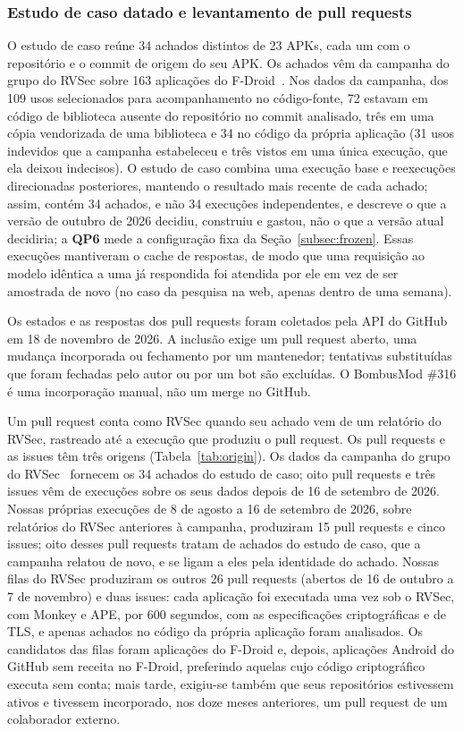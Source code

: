 \documentclass[conference]{IEEEtran}
\newcommand{\researchq}[1]{\textbf{QP#1}}
\begin{document}
\subsubsection{Estudo de caso datado e levantamento de pull requests}

O estudo de caso reúne 34 achados distintos de 23 APKs, cada um com o
repositório e o commit de origem do seu APK. Os achados vêm da campanha do grupo do
RVSec sobre 163 aplicações do F-Droid~\cite{costa2026effectiveness}. Nos dados da campanha, dos 109 usos
selecionados para acompanhamento no código-fonte, 72 estavam em
código de biblioteca ausente do repositório no commit analisado, três em uma cópia
vendorizada de uma biblioteca e 34 no código da própria aplicação (31 usos
indevidos que a campanha estabeleceu e três vistos em uma única execução, que
ela deixou indecisos). O estudo de caso combina uma execução base e reexecuções
direcionadas posteriores, mantendo o resultado mais recente de cada achado; assim, contém 34
achados, e não 34 execuções independentes, e descreve o que a
versão de outubro de 2026 decidiu, construiu e gastou, não o que a versão atual
decidiria; a \researchq{6} mede a configuração fixa da
Seção~\ref{subsec:frozen}. Essas execuções mantiveram o cache de respostas, de
modo que uma requisição ao modelo idêntica a uma já respondida foi atendida por
ele em vez de ser amostrada de novo (no caso da pesquisa na web, apenas dentro
de uma semana).

Os estados e as respostas dos pull requests foram coletados pela API do GitHub em
18 de novembro de 2026. A inclusão exige um pull request aberto, uma mudança incorporada ou fechamento
por um mantenedor; tentativas substituídas que foram fechadas pelo autor ou por um bot são
excluídas. O BombusMod \#316 é uma incorporação manual, não um merge no GitHub.

Um pull request conta como RVSec quando seu achado vem de um relatório do RVSec,
rastreado até a execução que produziu o pull request. Os pull requests e as
issues têm três origens (Tabela~\ref{tab:origin}). Os dados da campanha do grupo do
RVSec~\cite{costa2026effectiveness} fornecem os 34 achados do estudo de caso;
oito pull requests e três issues vêm de execuções sobre os seus dados depois de
16 de setembro de 2026. Nossas próprias execuções de 8 de agosto a 16 de
setembro de 2026, sobre relatórios do RVSec anteriores à campanha, produziram
15 pull requests e cinco issues; oito desses pull requests tratam de achados do
estudo de caso, que a campanha relatou de novo, e se ligam a eles pela
identidade do achado. Nossas filas do RVSec produziram os outros 26 pull
requests (abertos de 16 de outubro a 7 de novembro) e duas issues: cada
aplicação foi executada uma vez sob o RVSec, com Monkey e APE, por 600
segundos, com as especificações criptográficas e de TLS, e apenas achados no
código da própria aplicação foram analisados. Os candidatos das filas foram
aplicações do F-Droid e, depois, aplicações Android do GitHub sem receita no
F-Droid, preferindo aquelas cujo código criptográfico executa sem conta; mais
tarde, exigiu-se também que seus repositórios estivessem ativos e tivessem
incorporado, nos doze meses anteriores, um pull request de um colaborador
externo.
\end{document}
